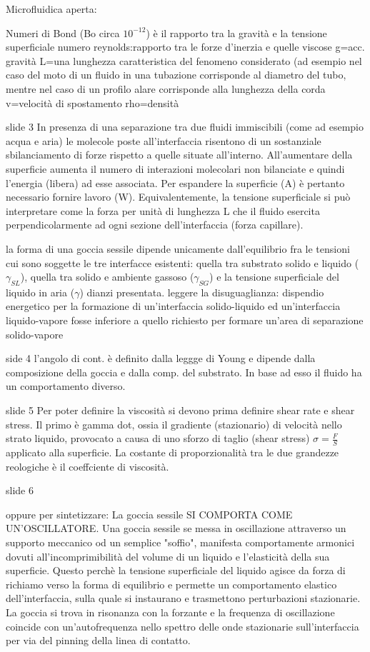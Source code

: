 \documentclass[letterpaper,12pt]{article}
\begin{document}
Microfluidica aperta:

Numeri di Bond (Bo circa $10^{-12}$) è il rapporto tra la gravità e la tensione superficiale
numero reynolds:rapporto tra le forze d'inerzia e quelle viscose
g=acc. gravità
L=una lunghezza caratteristica del fenomeno considerato (ad esempio nel caso del moto di un fluido in una tubazione corrisponde al diametro del tubo, mentre nel caso di un profilo alare corrisponde alla lunghezza della corda
v=velocità di spostamento
rho=densità

slide 3
In presenza di una separazione tra due fluidi immiscibili (come ad esempio acqua e aria) le molecole poste all'interfaccia risentono di un sostanziale sbilanciamento di forze rispetto a quelle situate all'interno.
All'aumentare della superficie aumenta il numero di interazioni molecolari non bilanciate e quindi l'energia (libera) ad esse associata. Per espandere la superficie (A) è pertanto necessario fornire lavoro (W). Equivalentemente, la tensione superficiale si può interpretare come la forza per unità di lunghezza L che il fluido esercita perpendicolarmente ad ogni sezione dell'interfaccia (forza capillare).

la forma di una goccia sessile dipende unicamente dall'equilibrio fra le tensioni cui sono soggette le tre interfacce esistenti: quella tra substrato solido e liquido ($\gamma_{SL}$), quella tra solido e ambiente gassoso ($\gamma_{SG}$) e la tensione superficiale del liquido in aria ($\gamma$) dianzi presentata. 
leggere la disuguaglianza:
dispendio energetico per la formazione di un'interfaccia solido-liquido ed un'interfaccia liquido-vapore fosse inferiore a quello richiesto per formare un'area di separazione solido-vapore 

side 4
l'angolo di cont. è definito dalla leggge di Young e dipende dalla composizione della goccia e dalla comp. del substrato.
In base ad esso il fluido ha un comportamento diverso.

slide 5
Per poter definire la viscosità si devono prima definire shear rate e shear stress. Il primo è gamma dot, ossia il gradiente (stazionario) di velocità nello strato liquido,  provocato a causa di uno sforzo di taglio (shear stress) $\sigma=\frac{F}{S}$ applicato alla superficie.
La costante di proporzionalità tra le due grandezze
reologiche è il coeffciente di viscosità.

slide 6

oppure per sintetizzare: La goccia sessile SI COMPORTA COME UN'OSCILLATORE.
Una goccia sessile se messa in oscillazione attraverso un supporto meccanico od un semplice "soffio", manifesta comportamente armonici dovuti all'incomprimibilità del volume di un liquido e l'elasticità della sua superficie.
Questo perchè la tensione superficiale del liquido agisce da forza di richiamo verso la forma di equilibrio e permette un comportamento elastico dell'interfaccia, sulla quale si instaurano e trasmettono perturbazioni stazionarie. La goccia si trova in risonanza con la forzante e la frequenza di oscillazione coincide con un'autofrequenza nello spettro delle onde stazionarie sull'interfaccia per via del pinning della linea di contatto.
\end{document}

